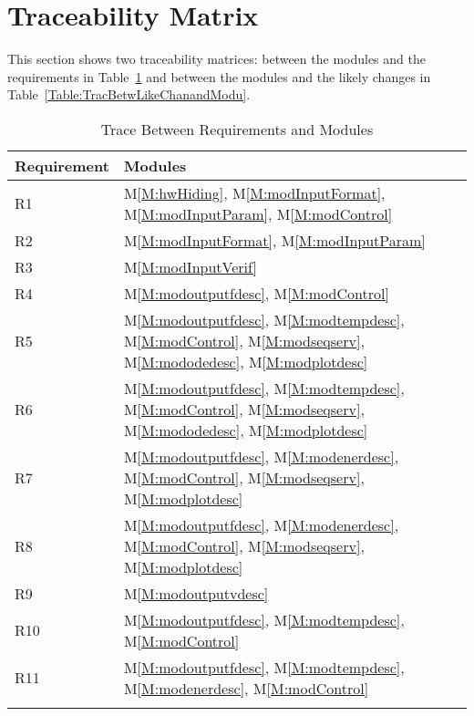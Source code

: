\documentclass[12pt]{article}
\begin{document}
\section{Traceability Matrix}
\label{Sec:TracMatr}
This section shows two traceability matrices: between the modules and the requirements in Table~\ref{Table:TracBetwRequandModu} and between the modules and the likely changes in Table~\ref{Table:TracBetwLikeChanandModu}.
\begin{longtable}{l l}
\toprule
Requirement & Modules
\\
\midrule
R1 & M\ref{M:hwHiding}, M\ref{M:modInputFormat}, M\ref{M:modInputParam}, M\ref{M:modControl}
\\
R2 & M\ref{M:modInputFormat}, M\ref{M:modInputParam}
\\
R3 & M\ref{M:modInputVerif}
\\
R4 & M\ref{M:modoutputfdesc}, M\ref{M:modControl}
\\
R5 & M\ref{M:modoutputfdesc}, M\ref{M:modtempdesc}, M\ref{M:modControl}, M\ref{M:modseqserv}, M\ref{M:mododedesc}, M\ref{M:modplotdesc}
\\
R6 & M\ref{M:modoutputfdesc}, M\ref{M:modtempdesc}, M\ref{M:modControl}, M\ref{M:modseqserv}, M\ref{M:mododedesc}, M\ref{M:modplotdesc}
\\
R7 & M\ref{M:modoutputfdesc}, M\ref{M:modenerdesc}, M\ref{M:modControl}, M\ref{M:modseqserv}, M\ref{M:modplotdesc}
\\
R8 & M\ref{M:modoutputfdesc}, M\ref{M:modenerdesc}, M\ref{M:modControl}, M\ref{M:modseqserv}, M\ref{M:modplotdesc}
\\
R9 & M\ref{M:modoutputvdesc}
\\
R10 & M\ref{M:modoutputfdesc}, M\ref{M:modtempdesc}, M\ref{M:modControl}
\\
R11 & M\ref{M:modoutputfdesc}, M\ref{M:modtempdesc}, M\ref{M:modenerdesc}, M\ref{M:modControl}
\\
\bottomrule
\caption{Trace Between Requirements and Modules}
\label{Table:TracBetwRequandModu}
\end{longtable}
\end{document}
